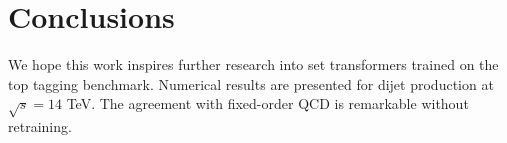 \section{Conclusions}\label{sec:conclusions}

We hope this work inspires further research into set transformers
trained on the top tagging benchmark. Numerical results are presented
for dijet production at $\sqrt{s} = 14$ TeV. The agreement with
fixed-order QCD is remarkable without retraining.

